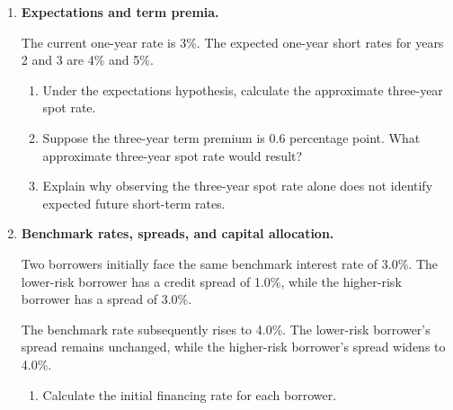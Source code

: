 \begin{enumerate}
\begin{enumerate}

\item Calculate the one-year forward rate beginning one year from today.

\item Verify that investing for two years at the two-year spot rate produces the same final value as investing for one year at the one-year spot rate and then at the implied forward rate.

\item Explain why the forward rate need not equal the expected future one-year short rate.

\end{enumerate}


\item \textbf{Expectations and term premia.}

The current one-year rate is 3\%. The expected one-year short rates for years 2 and 3 are 4\% and 5\%.

\begin{enumerate}

\item Under the expectations hypothesis, calculate the approximate three-year spot rate.

\item Suppose the three-year term premium is 0.6 percentage point. What approximate three-year spot rate would result?

\item Explain why observing the three-year spot rate alone does not identify expected future short-term rates.

\end{enumerate}


\item \textbf{Benchmark rates, spreads, and capital allocation.}

Two borrowers initially face the same benchmark interest rate of 3.0\%. The lower-risk borrower has a credit spread of 1.0\%, while the higher-risk borrower has a spread of 3.0\%.

The benchmark rate subsequently rises to 4.0\%. The lower-risk borrower's spread remains unchanged, while the higher-risk borrower's spread widens to 4.0\%.

\begin{enumerate}

\item Calculate the initial financing rate for each borrower.


\end{enumerate}
\end{enumerate}
